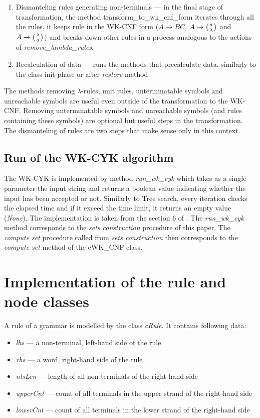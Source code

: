 \begin{enumerate}
  \item{Dismanteling rules generating non-terminals --- in the final stage of transformation, the method transform\_to\_wk\_cnf\_form} iterates through all the rules, it keeps rule in the WK-CNF form ($A \rightarrow BC$, $A \rightarrow \wkpair{a}{\lambda}$ and $A \rightarrow \wkpair{\lambda}{a}$) and breaks down other rules in a process analogous to the actions of \textit{remove\_lambda\_rules}.

  \item{Recalculation of data --- runs the methods that precalculate data, similarly to the class init phase or after \textit{restore} method}
\end{enumerate}

The methods removing $\lambda$-rules, unit rules, unterminatable symbols and unreachable symbols are useful even outside of the transformation to the WK-CNF. Removing unterminatable symbols and unreachable symbols (and rules containing these symbols) are optional but useful steps in the transformation. The dismanteling of rules are two steps that make sense only in this context.


\subsection{Run of the WK-CYK algorithm}
The WK-CYK is implemented by method \textit{run\_wk\_cyk} which takes as a single parameter the input string and returns a boolean value indicating whether the input has been accepted or not. Similarly to Tree search, every iteration checks the elapsed time and if it exceed the time limit, it returns an empty value (\textit{None}). The implementation is taken from the section 6 of \cite{WK_CYK}. The \textit{run\_wk\_cyk} method corresponds to the \textit{sets construction} procedure of this paper. The \textit{compute set} procedure called from \textit{sets construction} then corresponds to the \textit{compute set} method of the cWK\_CNF class.


\section{Implementation of the rule and node classes}
A rule of a grammar is modelled by the class \textit{cRule}. It contains following data:
\begin{itemize}
  \item{\textit{lhs} --- a non-terminal, left-hand side of the rule}
  \item{\textit{rhs} --- a word, right-hand side of the rule}
  \item{\textit{ntsLen} --- length of all non-terminals of the right-hand side}
  \item{\textit{upperCnt} --- count of all terminals in the upper strand of the right-hand side}
  \item{\textit{lowerCnt} --- count of all terminals in the lower strand of the right-hand side}
\end{itemize}


